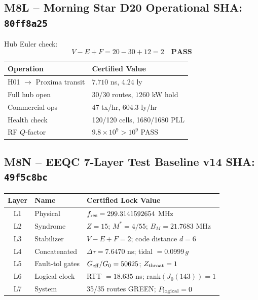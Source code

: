 \documentclass[12pt,letterpaper]{article}
\begin{document}
\subsection{M8L -- Morning Star D20 Operational \hfill SHA: \texttt{80ff8a25}}

Hub Euler check:
\begin{equation}
  V - E + F = 20 - 30 + 12 = 2 \quad\textbf{PASS}
\end{equation}

\begin{center}
\begin{tabular}{ll}
\toprule
Operation & Certified Value \\
\midrule
H01 $\to$ Proxima transit & $7.710$ ns, $4.24$ ly \\
Full hub open & 30/30 routes, $1260$ kW hold \\
Commercial ops & 47 tx/hr, $604.3$ ly/hr \\
Health check & 120/120 cells, 1680/1680 PLL \\
RF $Q$-factor & $9.8 \times 10^9 > 10^9$ \quad PASS \\
\bottomrule
\end{tabular}
\end{center}

\subsection{M8N -- EEQC 7-Layer Test Baseline v14 \hfill SHA: \texttt{49f5c8bc}}

\begin{center}
\begin{tabular}{cll}
\toprule
Layer & Name & Certified Lock Value \\
\midrule
L1 & Physical & $f_{\rm res} = 299.3141592654$ MHz \\
L2 & Syndrome & $Z = 15$; $M^* = 4/55$; $B_M = 21.7683$ MHz \\
L3 & Stabilizer & $V{-}E{+}F = 2$; code distance $d = 6$ \\
L4 & Concatenated & $\Delta\tau = 7.6470$ ns; tidal $= 0.0999\,g$ \\
L5 & Fault-tol gates & $G_{\rm eff}/G_0 = 50625$; $Z_{\rm throat} = 1$ \\
L6 & Logical clock & RTT $= 18.635$ ns; rank$(J_0(143)) = 1$ \\
L7 & System & 35/35 routes GREEN; $P_{\rm logical} = 0$ \\
\bottomrule
\end{tabular}
\end{center}
\end{document}

